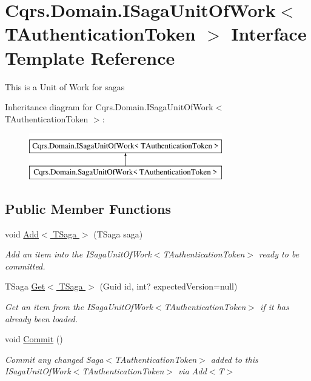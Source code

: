 \hypertarget{interfaceCqrs_1_1Domain_1_1ISagaUnitOfWork}{}\section{Cqrs.\+Domain.\+I\+Saga\+Unit\+Of\+Work$<$ T\+Authentication\+Token $>$ Interface Template Reference}
\label{interfaceCqrs_1_1Domain_1_1ISagaUnitOfWork}


This is a Unit of Work for sagas  


Inheritance diagram for Cqrs.\+Domain.\+I\+Saga\+Unit\+Of\+Work$<$ T\+Authentication\+Token $>$\+:\begin{figure}[H]
\begin{center}
\leavevmode
\includegraphics[height=2.000000cm]{interfaceCqrs_1_1Domain_1_1ISagaUnitOfWork}
\end{center}
\end{figure}
\subsection*{Public Member Functions}
\begin{DoxyCompactItemize}
\item 
void \hyperlink{interfaceCqrs_1_1Domain_1_1ISagaUnitOfWork_a5e7c8e18a8d71fc915db48fac00e7da4_a5e7c8e18a8d71fc915db48fac00e7da4}{Add$<$ T\+Saga $>$} (T\+Saga saga)
\begin{DoxyCompactList}\small\item\em Add an item into the I\+Saga\+Unit\+Of\+Work$<$\+T\+Authentication\+Token$>$ ready to be committed. \end{DoxyCompactList}\item 
T\+Saga \hyperlink{interfaceCqrs_1_1Domain_1_1ISagaUnitOfWork_a4c4745fcebc42ba5c94647b22939809b_a4c4745fcebc42ba5c94647b22939809b}{Get$<$ T\+Saga $>$} (Guid id, int? expected\+Version=null)
\begin{DoxyCompactList}\small\item\em Get an item from the I\+Saga\+Unit\+Of\+Work$<$\+T\+Authentication\+Token$>$ if it has already been loaded. \end{DoxyCompactList}\item 
void \hyperlink{interfaceCqrs_1_1Domain_1_1ISagaUnitOfWork_aaa8a63b5304c837deec8a0103eb702f7_aaa8a63b5304c837deec8a0103eb702f7}{Commit} ()
\begin{DoxyCompactList}\small\item\em Commit any changed Saga$<$\+T\+Authentication\+Token$>$ added to this I\+Saga\+Unit\+Of\+Work$<$\+T\+Authentication\+Token$>$ via Add$<$\+T$>$ \end{DoxyCompactList}\end{DoxyCompactItemize}


